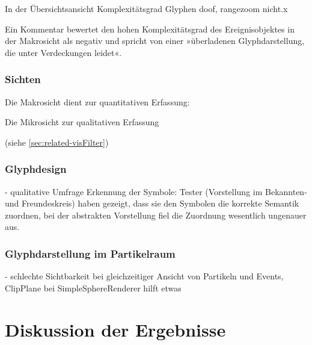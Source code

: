 In der Übersichtsansicht Komplexitätsgrad Glyphen doof, rangezoom nicht.x

Ein Kommentar bewertet den hohen Komplexitätsgrad des Ereignisobjektes in der Makrosicht als negativ und spricht von einer »überladenen Glyphdarstellung, die unter Verdeckungen leidet«.


\subsection{Sichten}
Die Makrosicht dient zur quantitativen Erfassung:

Die Mikrosicht zur qualitativen Erfassung 

(siehe \autoref{sec:related-visFilter})



\subsection{Glyphdesign}
- qualitative Umfrage Erkennung der Symbole: Tester (Vorstellung im Bekannten- und Freundeskreis) haben gezeigt, dass sie den Symbolen die korrekte Semantik zuordnen, bei der abstrakten Vorstellung fiel die Zuordnung wesentlich ungenauer aus. %

\subsection{Glyphdarstellung im Partikelraum}

- schlechte Sichtbarkeit bei gleichzeitiger Ansicht von Partikeln und Events, ClipPlane bei SimpleSphereRenderer hilft etwas %



\chapter{Diskussion der Ergebnisse}\label{sec:diskussion}


